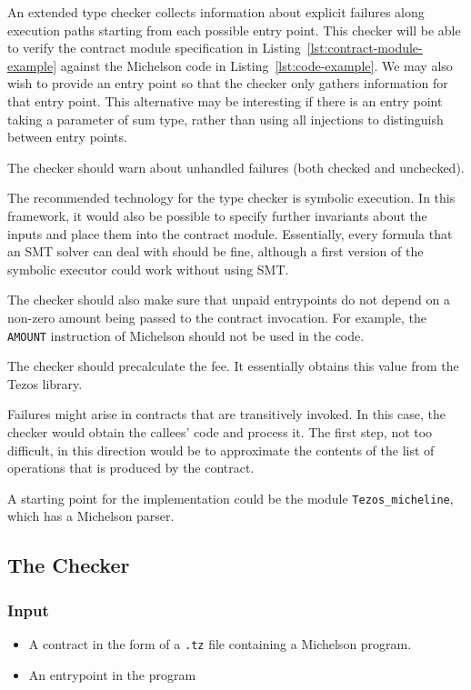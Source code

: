 \documentclass[a4paper]{llncs}
\begin{document}
An extended type checker collects information about explicit failures
along execution paths starting from each possible entry point. This
checker will be able to verify the contract module specification in
Listing~\ref{lst:contract-module-example} against the Michelson code
in Listing~\ref{lst:code-example}. We may also wish to provide an
entry point so that the checker only gathers information for that
entry point. This alternative may be interesting if there is an entry
point taking a parameter of sum type, rather than using all injections
to distinguish between entry points.

The checker should warn about unhandled failures (both checked and unchecked).

The recommended technology for the type checker is symbolic
execution. In this framework, it would also 
be possible to specify further invariants about the inputs and place them into the contract
module. Essentially, every formula that an SMT solver can deal with
should be fine, although a first version of the symbolic executor
could work without using SMT.

The checker should also make sure that unpaid entrypoints do not
depend on a non-zero amount being passed to the contract
invocation. For example, the \texttt{AMOUNT} instruction of Michelson
should not be used in the code.  

The checker should precalculate the fee. It essentially obtains
this value from the Tezos library.

Failures might arise in contracts that are transitively invoked. In
this case, the checker would obtain the callees' code and process
it. The first step, not too difficult, in this direction would be to
approximate the contents of the list of operations that is produced by
the contract. 

A starting point for the implementation could be the module \lstinline/Tezos_micheline/, which has a
Michelson parser.

\subsection{The Checker}
\label{sec:checker}

\subsubsection{Input}
\begin{itemize}
\item A contract in the form of a \texttt{.tz} file containing a
  Michelson program.
\item An entrypoint in the program
\end{itemize}
\end{document}
